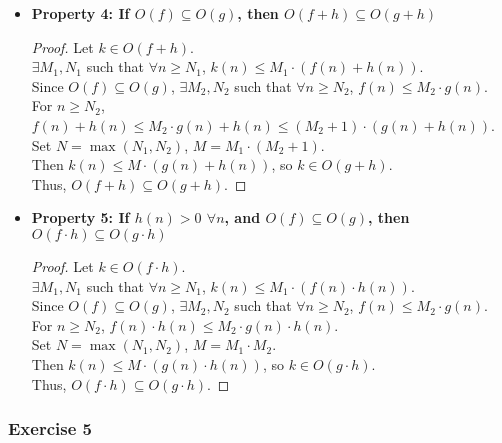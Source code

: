 \documentclass{article}
\theoremstyle{theorem}
\theoremstyle{definition}
\theoremstyle{remark}
\begin{document}
\begin{itemize}
    \item \textbf{Property 4: If $O(f) \subseteq O(g)$, then $O(f + h) \subseteq O(g + h)$}
    \begin{proof}
        Let $k \in O(f + h)$. \\
        $\exists M_1, N_1$ such that $\forall n \geq N_1$, $k(n) \leq M_1 \cdot (f(n) + h(n))$. \\
        Since $O(f) \subseteq O(g)$, $\exists M_2, N_2$ such that $\forall n \geq N_2$, $f(n) \leq M_2 \cdot g(n)$. \\
        For $n \geq N_2$, $f(n) + h(n) \leq M_2 \cdot g(n) + h(n) \leq (M_2 + 1) \cdot (g(n) + h(n))$. \\
        Set $N = \max(N_1, N_2)$, $M = M_1 \cdot (M_2 + 1)$. \\
        Then $k(n) \leq M \cdot (g(n) + h(n))$, so $k \in O(g + h)$. \\
        Thus, $O(f + h) \subseteq O(g + h)$.
    \end{proof}

    \item \textbf{Property 5: If $h(n) > 0$ $\forall n$, and $O(f) \subseteq O(g)$, then $O(f \cdot h) \subseteq O(g \cdot h)$}
    \begin{proof}
        Let $k \in O(f \cdot h)$. \\
        $\exists M_1, N_1$ such that $\forall n \geq N_1$, $k(n) \leq M_1 \cdot (f(n) \cdot h(n))$. \\
        Since $O(f) \subseteq O(g)$, $\exists M_2, N_2$ such that $\forall n \geq N_2$, $f(n) \leq M_2 \cdot g(n)$. \\
        For $n \geq N_2$, $f(n) \cdot h(n) \leq M_2 \cdot g(n) \cdot h(n)$. \\
        Set $N = \max(N_1, N_2)$, $M = M_1 \cdot M_2$. \\
        Then $k(n) \leq M \cdot (g(n) \cdot h(n))$, so $k \in O(g \cdot h)$. \\
        Thus, $O(f \cdot h) \subseteq O(g \cdot h)$.
    \end{proof}
\end{itemize}

\subsubsection{Exercise 5}
\end{document}
